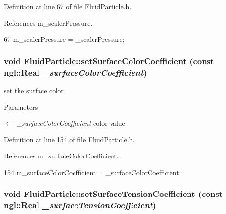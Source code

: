 Definition at line 67 of file FluidParticle.h.



References m\_\-scalerPressure.




\begin{DoxyCode}
67 {m_scalerPressure = _scalerPressure;}
\end{DoxyCode}


\hypertarget{class_fluid_particle_aefabd64a31db41499e71c57baf54bfe5}{
\subsubsection[{setSurfaceColorCoefficient}]{\setlength{\rightskip}{0pt plus 5cm}void FluidParticle::setSurfaceColorCoefficient (const ngl::Real {\em \_\-surfaceColorCoefficient})}}
\label{class_fluid_particle_aefabd64a31db41499e71c57baf54bfe5}


set the surface color 


\begin{DoxyParams}{Parameters}
\item[\mbox{$\leftarrow$} {\em \_\-surfaceColorCoefficient}]color value \end{DoxyParams}


Definition at line 154 of file FluidParticle.h.



References m\_\-surfaceColorCoefficient.




\begin{DoxyCode}
154 { m_surfaceColorCoefficient = _surfaceColorCoefficient; }
\end{DoxyCode}


\hypertarget{class_fluid_particle_ab7fc0bcc4a6100ef5110df0c4b0b7486}{
\subsubsection[{setSurfaceTensionCoefficient}]{\setlength{\rightskip}{0pt plus 5cm}void FluidParticle::setSurfaceTensionCoefficient (const ngl::Real {\em \_\-surfaceTensionCoefficient})}}
\label{class_fluid_particle_ab7fc0bcc4a6100ef5110df0c4b0b7486}


